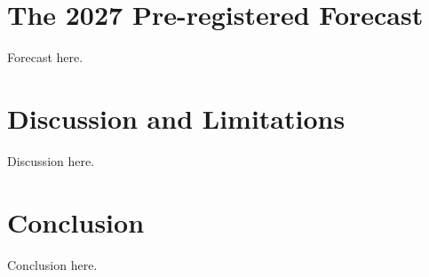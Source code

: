 \documentclass[preprint,12pt,authoryear]{elsarticle}
\begin{document}
\section{The 2027 Pre-registered Forecast}
\label{sec:forecast}
Forecast here.

\section{Discussion and Limitations}
\label{sec:discussion}
Discussion here.

\section{Conclusion}
\label{sec:conclusion}
Conclusion here.




\end{document}
